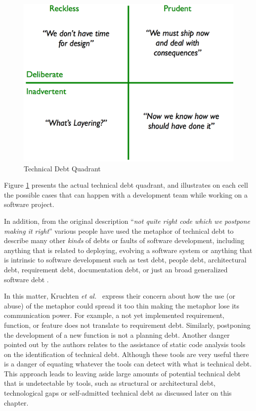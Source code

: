\begin{figure}[thb!]
  \centering
  \vspace{5mm}
  \includegraphics[width=.65\textwidth]{figures/literature_review/technical_debt_quadrant.png}
  \caption{Technical Debt Quadrant\cite{MartinFowler:TechnicalDebtQuadrant}}
  \label{fig:technical_debt_quadrant}
\end{figure}
  
Figure \ref{fig:technical_debt_quadrant} presents the actual technical debt quadrant, and illustrates on each cell the possible cases that can happen with a development team while working on a software project. 

In addition, from the original description ``\textit{not quite right code which we postpone making it right}'' various people have used the metaphor of technical debt to describe many other \emph{kinds} of debts or faults of software development, including anything that is related to deploying, evolving a software system or anything that is intrinsic to software development such as test debt, people debt, architectural debt, requirement debt, documentation debt, or just an broad generalized software debt \cite{sterling2010book}. 

In this matter, Kruchten \textit{et al.}~\cite{kruchten2012IEEE} express their concern about how the use (or abuse) of the metaphor could spread it too thin making the metaphor lose its communication power. For example, a not yet implemented requirement, function, or feature does not translate to  requirement debt. Similarly, postponing the development of a new function is not a planning debt. Another danger pointed out by the authors relates to the assistance of static code analysis tools on the identification of technical debt. Although these tools are very useful there is a danger of equating whatever the tools can detect with what is technical debt. This approach leads to leaving aside large amounts of potential technical debt that is undetectable by tools, such as structural or architectural debt, technological gaps or self-admitted technical debt as discussed later on this chapter. 

